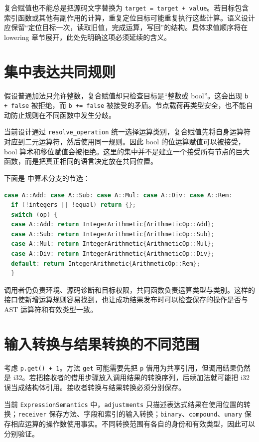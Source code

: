 复合赋值也不能总是把源码文字替换为 \lstinline[language=Rustless]|target = target + value|。若目标包含索引函数或其他有副作用的计算，重复定位目标可能重复执行这些计算。语义设计应保留“定位目标一次，读取旧值，完成运算，写回”的结构。具体求值顺序将在 lowering 章节展开，此处先明确这项必须延续的含义。

\section{集中表达共同规则}
假设普通加法只允许整数，复合赋值却只检查目标是“整数或 bool”。这会出现 \lstinline[language=Rustless]|b + false| 被拒绝，而 \lstinline[language=Rustless]|b += false| 被接受的矛盾。节点载荷再类型安全，也不能自动防止规则在不同函数中发生分歧。

当前设计通过 \texttt{resolve\_operation} 统一选择运算类别，复合赋值先将自身运算符对应到二元运算符，然后使用同一规则。因此 bool 的位运算赋值可以被接受，bool 算术和移位赋值会被拒绝。这里的集中并不是建立一个接受所有节点的巨大函数，而是把真正相同的语言决定放在共同位置。

下面是  中算术分支的节选：
\begin{lstlisting}[language=C++]
case A::Add: case A::Sub: case A::Mul: case A::Div: case A::Rem:
  if (!integers || !equal) return {};
  switch (op) {
  case A::Add: return IntegerArithmetic{ArithmeticOp::Add};
  case A::Sub: return IntegerArithmetic{ArithmeticOp::Sub};
  case A::Mul: return IntegerArithmetic{ArithmeticOp::Mul};
  case A::Div: return IntegerArithmetic{ArithmeticOp::Div};
  default: return IntegerArithmetic{ArithmeticOp::Rem};
  }
\end{lstlisting}
调用者仍负责环境、源码诊断和目标权限，共同函数负责运算类型与类别。这样的接口使新增运算规则容易找到，也让成功结果发布时可以检查保存的操作是否与 AST 运算符和有效类型一致。

\section{输入转换与结果转换的不同范围}
考虑 \lstinline[language=Rustless]|p.get() + 1|。方法 \lstinline[language=Rustless]|get| 可能需要先把 \lstinline[language=Rustless]|p| 借用为共享引用，但调用结果仍然是 i32。若把接收者的借用步骤放入调用结果的转换序列，后续加法就可能把 i32 误当成结构体引用。接收者转换与结果转换必须分别保存。

当前 \texttt{ExpressionSemantics} 中，\texttt{adjustments} 只描述表达式结果在使用位置的转换；\texttt{receiver} 保存方法、字段和索引的输入转换；\texttt{binary}、\texttt{compound}、\texttt{unary} 保存相应运算的操作数使用事实。不同转换范围有各自的身份和有效类型，因此可以分别验证。

